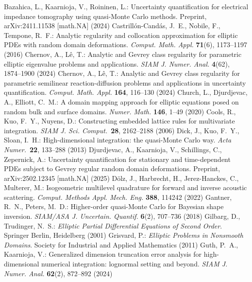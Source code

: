 \documentclass[graybox]{svmult}
\begin{document}
\begin{thebibliography}{99}
 Bazahica, L., Kaarnioja, V., Roininen, L.: Uncertainty quantification for electrical impedance tomography using quasi-Monte Carlo methods. Preprint, arXiv:2411.11538 [math.NA] (2024)
 Castrill\'on-Cand\'as, J.~E., Nobile, F., Tempone, R.~F.: Analytic regularity and collocation approximation for elliptic PDEs with random domain deformations. \emph{Comput. Math. Appl.} \textbf{71}(6), 1173--1197 (2016)
 Chernov, A., L{\^{e}}, T.: Analytic and Gevrey class regularity for parametric elliptic eigenvalue problems and applications. {\em SIAM J. Numer. Anal.} \textbf{4}(62), 1874--1900 (2024)
 Chernov, A., L{\^{e}}, T.: Analytic and Gevrey class regularity for parametric semilinear reaction-diffusion problems and applications in uncertainty quantification. {\em Comput. Math. Appl.} \textbf{164}, 116--130 (2024)
 Church, L., Djurdjevac, A., Elliott, C.~M.: A domain mapping approach for elliptic equations posed on random bulk and surface domains. \emph{Numer. Math.} \textbf{146}, 1--49 (2020)
 Cools, R., Kuo, F.~Y., Nuyens, D.: Constructing embedded lattice rules for multivariate integration. {\em SIAM J. Sci. Comput.}~\textbf{28}, 2162--2188 (2006)
 Dick, J., Kuo, F.~Y., Sloan, I.~H.: High-dimensional integration: the quasi-Monte Carlo way. {\em Acta Numer.}~\textbf{22}, 133--288 (2013)
 Djurdjevac, A., Kaarnioja, V., Schillings, C., Zepernick, A.: Uncertainty quantification for stationary and time-dependent PDEs subject to Gevrey regular random domain deformations. Preprint, arXiv:2502.12345 [math.NA] (2025)
 D\"olz, J., Harbrecht, H., Jerez-Hanckes, C., Multerer, M.: Isogeometric multilevel quadrature for forward and inverse acoustic scattering. \emph{Comput. Methods Appl. Mech. Eng.} \textbf{388}, 114242 (2022) 
 Gantner, R.~N., Peters, M.~D.: Higher-order quasi-Monte Carlo for Bayesian shape inversion. {\em SIAM/ASA J. Uncertain. Quantif.} \textbf{6}(2), 707--736 (2018)
 Gilbarg, D., Trudinger, N.~S.: {\em Elliptic Partial Differential Equations of Second Order}. Springer Berlin, Heidelberg (2001)
 Grisvard, P.: {\em Elliptic Problems in Nonsmooth Domains}. Society for Industrial and Applied Mathematics (2011)
 Guth, P.~A., Kaarnioja, V.: Generalized dimension truncation error analysis for high-dimensional numerical integration: lognormal setting and beyond. \emph{SIAM J. Numer. Anal.} \textbf{62}(2), 872--892 (2024)

\end{thebibliography}
\end{document}

